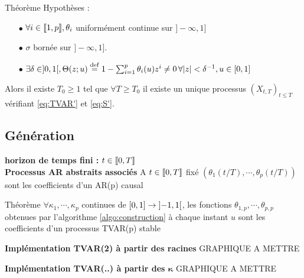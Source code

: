 \documentclass[11pt]{beamer}
\begin{document}
\begin{frame}
\begin{alertblock}{Théorème}
Hypothèses : 
\begin{itemize}
\item[$\bullet$] $\forall i\in {\left\llbracket 1,p \right\rrbracket}, \theta_i$ uniformément continue sur $]-\infty,1]$
\item[$\bullet$] $\sigma$ bornée sur $]-\infty,1]$. 
\item[$\bullet$] $\exists \delta \in ]0,1[, \Theta(z;u) \stackrel{\rm def}{=}  1 - \sum_{i=1}^p \theta_i(u) z^i \neq 0 \, \forall { \left| z \right|} < \delta^{-1}, u\in [0,1]$
\end{itemize}
Alors il existe $T_0 \geq 1$ tel que $\forall T \geq T_0$ il existe un unique processus $(X_{t,T})_{t\leq T}$ vérifiant \eqref{eq:TVAR'} et \eqref{eq:S'}.
\end{alertblock}
\end{frame}

\subsection{Génération}
\begin{frame}
\textbf{horizon de temps fini : } $t\in {\left\llbracket 0,T \right\rrbracket}$ \\
\textbf{Processus AR abstraits associés}
A $t\in {\left\llbracket 0,T \right\rrbracket}$ fixé $(\theta_1(t/T), \cdots , \theta_p(t/T))$ sont les coefficients d'un AR(p) causal 
\begin{alertblock}{Théorème}
$\forall \kappa_1, \cdots, \kappa_p$ continues de $[0,1]\to {\left] -1,1 \right[}$, les fonctions $\theta_{1,p},\cdots, \theta_{p,p}$ obtenues par l'algorithme \ref{algo:construction} à chaque instant $u$ sont les coefficients d'un processus TVAR(p) stable
\end{alertblock}
\end{frame}

\begin{frame}
\textbf{Implémentation TVAR(2) à partir des racines} GRAPHIQUE A METTRE

\end{frame}

\begin{frame}
\textbf{Implémentation TVAR(..) à partir des $\boldsymbol\kappa$} GRAPHIQUE A METTRE

\end{frame}
\end{document}
